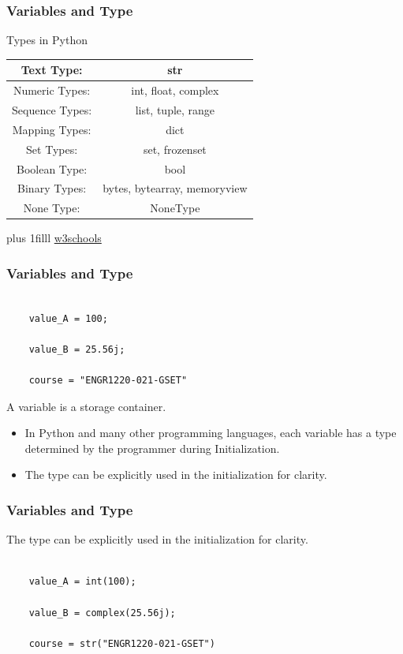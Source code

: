 \documentclass[fleqn]{beamer} %
\newcommand{\sectiontitleII}{Variables and Type}
\newcommand{\btVFill}{\vskip0pt plus 1filll}
\begin{document}
	\begin{frame} \small
		\frametitle{\sectiontitleII}
			
		Types in Python \vspace{5mm}\\
		\renewcommand*{\arraystretch}{1.5}
		\begin{tabular}{|c|c|}\hline			
			Text Type:& str  \\ \hline
			Numeric Types: & int, float, complex \\ \hline
			Sequence Types:& list, tuple, range \\ \hline 	
			Mapping Types:& dict \\ \hline
			Set Types:& set, frozenset\\ \hline
			Boolean Type:& bool \\ \hline
			Binary Types:& bytes, bytearray, memoryview\\ \hline
			None Type: & NoneType\\ \hline	 			
		\end{tabular}
	
	\btVFill
	{\tiny \href{https://www.w3schools.com/python/python_datatypes.asp}{w3schools}}
	\end{frame}


	\begin{frame}[label=sectionII,containsverbatim] \small
		\frametitle{\sectiontitleII}

	
			\begin{lstlisting}
			
	value_A = 100; 
				
	value_B = 25.56j;

	course = "ENGR1220-021-GSET"
			\end{lstlisting}
	
			A variable is a storage container.
			\begin{itemize}
				\item In Python and many other programming languages, each variable has a type determined by the programmer during {\BL Initialization}.
				\item The type can be explicitly used in the initialization for clarity.
			\end{itemize}
	
		\end{frame}

	\begin{frame}[label=sectionII,containsverbatim] \small
		\frametitle{\sectiontitleII}
	
	  The type can be explicitly used in the initialization for clarity.
		

		\begin{lstlisting}
			
	value_A = int(100); 
				
	value_B = complex(25.56j);

	course = str("ENGR1220-021-GSET")
			\end{lstlisting}

	
		\end{frame}
\end{document}
